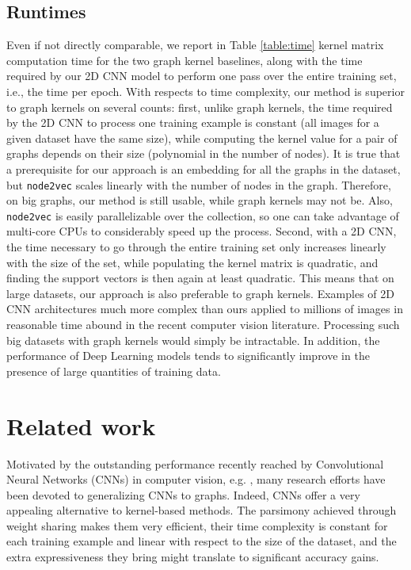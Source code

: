 \documentclass[sigconf]{acmart}
\begin{document}
\subsection{Runtimes}
Even if not directly comparable, we report in Table \ref{table:time} kernel matrix computation time for the two graph kernel baselines, along with the time required by our 2D CNN model to perform one pass over the entire training set, i.e., the time per epoch. With respects to time complexity, our method is superior to graph kernels on several counts: first, unlike graph kernels, the time required by the 2D CNN to process one training example is constant (all images for a given dataset have the same size), while computing the kernel value for a pair of graphs depends on their size (polynomial in the number of nodes). It is true that a prerequisite for our approach is an embedding for all the graphs in the dataset, but \texttt{node2vec} scales linearly with the number of nodes in the graph. Therefore, on big graphs, our method is still usable, while graph kernels may not be. Also, \texttt{node2vec} is easily parallelizable over the collection, so one can take advantage of multi-core CPUs to considerably speed up the process. Second, with a 2D CNN, the time necessary to go through the entire training set only increases linearly with the size of the set, while populating the kernel matrix is quadratic, and finding the support vectors is then again at least quadratic. This means that on large datasets, our approach is also preferable to graph kernels. Examples of 2D CNN architectures much more complex than ours applied to millions of images in reasonable time abound in the recent computer vision literature. Processing such big datasets with graph kernels would simply be intractable. In addition, the performance of Deep Learning models tends to significantly improve in the presence of large quantities of training data.

\section{Related work}
Motivated by the outstanding performance recently reached by Convolutional Neural Networks (CNNs) in computer vision, e.g. \citep{vinyals2015show,krizhevsky2012imagenet}, many research efforts have been devoted to generalizing CNNs to graphs. Indeed, CNNs offer a very appealing alternative to kernel-based methods. The parsimony achieved through weight sharing makes them very efficient, their time complexity is constant for each training example and linear with respect to the size of the dataset, and the extra expressiveness they bring might translate to significant accuracy gains.
\end{document}
